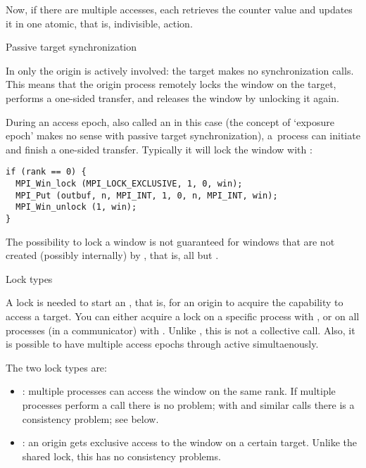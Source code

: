 Now, if there are multiple accesses, each retrieves the counter value
and updates it in one atomic, that is, indivisible, action.


 {Passive target synchronization}
\label{sec:passive-sync}

In  only the origin is
actively involved: the target makes no synchronization calls.
This means that the origin process remotely locks the window
on the target, performs a one-sided transfer, and releases the window
by unlocking it again.

During an access epoch, also called an
 in this case
(the concept of `exposure epoch' makes no sense with passive target synchronization),
a~process can initiate and finish a one-sided
transfer. Typically it will lock the window with
:

\begin{lstlisting}
if (rank == 0) {
  MPI_Win_lock (MPI_LOCK_EXCLUSIVE, 1, 0, win);
  MPI_Put (outbuf, n, MPI_INT, 1, 0, n, MPI_INT, win);
  MPI_Win_unlock (1, win);
}
\end{lstlisting}

\begin{remark}
  The possibility to lock a window is not guaranteed for windows
  that are not created (possibly internally) by ,
  that is, all but .
\end{remark}

 {Lock types}

A lock is needed to start an , that is,
for an origin to acquire the capability to access a target.
You can either acquire a lock on a specific process with ,
or on all processes (in a communicator) with .
Unlike , this is not a collective call.
Also, it is possible to have multiple access epochs through 
active simultaenously.

The two lock types are:
\begin{itemize}
\item {}: multiple processes can access 
  the window on the same rank.
  If multiple processes perform a  call there
  is no problem; with  and similar calls
  there is a consistency problem; see below.
\item {}: an origin gets exclusive access to the
  window on a certain target.
  Unlike the shared lock, this has no consistency problems.
\end{itemize}

